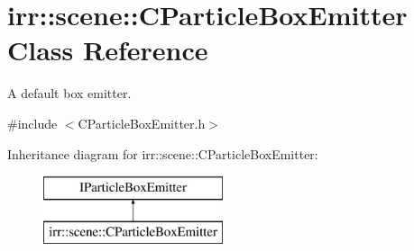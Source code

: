 \hypertarget{classirr_1_1scene_1_1_c_particle_box_emitter}{\section{irr\-:\-:scene\-:\-:C\-Particle\-Box\-Emitter Class Reference}
\label{classirr_1_1scene_1_1_c_particle_box_emitter}
}


A default box emitter.  




{\ttfamily \#include $<$C\-Particle\-Box\-Emitter.\-h$>$}

Inheritance diagram for irr\-:\-:scene\-:\-:C\-Particle\-Box\-Emitter\-:\begin{figure}[H]
\begin{center}
\leavevmode
\includegraphics[height=2.000000cm]{classirr_1_1scene_1_1_c_particle_box_emitter}
\end{center}
\end{figure}
